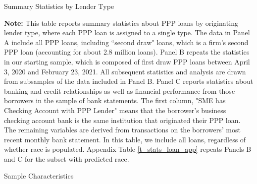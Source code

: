 \documentclass[11pt]{article}
\begin{document}
\newpage
\begin{table}[H]
	\caption{Summary Statistics by Lender Type} \label{t_stats_loan}
	
		\begin{adjustbox}{width=\linewidth, center}
		
	\end{adjustbox}
	
	\begin{adjustbox}{width=\linewidth, center}
		
	\end{adjustbox}

	\begin{adjustbox}{width=\linewidth, center}
		
	\end{adjustbox}

	\begin{minipage}{\textwidth} \medskip
		\footnotesize{{\bf Note: }This table reports summary statistics about PPP loans by originating lender type, where each PPP loan is assigned to a single type. The data in Panel A include all PPP loans, including ``second draw" loans, which is a firm's second PPP loan (accounting for about 2.8 million loans). Panel B repeats the statistics in our starting sample, which is composed of first draw PPP loans between April 3, 2020 and February 23, 2021. All subsequent statistics and analysis are drawn from subsamples of the data included in Panel B. Panel C reports statistics about banking and credit relationships as well as financial performance from those borrowers in the sample of bank statements. The first column, "SME has Checking Account with PPP Lender" means that the borrower's business checking account bank is the same institution that originated their PPP loan. The remaining variables are derived from transactions on the borrowers' most recent monthly bank statement. In this table, we include all loans, regardless of whether race is populated. Appendix Table \ref{t_stats_loan_app} repeats Panels B and C for the subset with predicted race.}
	\end{minipage}
\end{table}

\newpage
\begin{table}[H]
	\caption{Sample Characteristics} \label{t_stats_samples}
	\begin{adjustbox}{width=\linewidth, center}
		
	\end{adjustbox}

	\begin{adjustbox}{width=\linewidth, center}
		
	\end{adjustbox}

	\begin{adjustbox}{width=\linewidth, center}
		
	\end{adjustbox}
\end{table}
\end{document}
